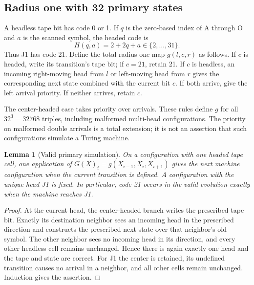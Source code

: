 \documentclass[11pt,letterpaper]{article}
\newtheorem{lemma}[theorem]{Lemma}
\theoremstyle{definition}\newtheorem{definition}[theorem]{Definition}
\theoremstyle{remark}\newtheorem{remark}[theorem]{Remark}
\begin{document}
\subsection{Radius one with 32 primary states}
A headless tape bit has code 0 or 1. If $q$ is the zero-based index of A through O and $a$ is the scanned symbol, the headed code is
\[
 H(q,a)=2+2q+a\in\{2,\ldots,31\}.
\]
Thus J1 has code 21. Define the total radius-one map $g(l,c,r)$ as follows. If $c$ is headed, write its transition's tape bit; if $c=21$, retain 21. If $c$ is headless, an incoming right-moving head from $l$ or left-moving head from $r$ gives the corresponding next state combined with the current bit $c$. If both arrive, give the left arrival priority. If neither arrives, retain $c$.

The center-headed case takes priority over arrivals. These rules define $g$ for all $32^3=32768$ triples, including malformed multi-head configurations. The priority on malformed double arrivals is a total extension; it is not an assertion that such configurations simulate a Turing machine.

\begin{lemma}[Valid primary simulation]\label{ptr:la:lem:primary}
On a configuration with one headed tape cell, one application of $G(X)_i=g(X_{i-1},X_i,X_{i+1})$ gives the next machine configuration when the current transition is defined. A configuration with the unique head J1 is fixed. In particular, code 21 occurs in the valid evolution exactly when the machine reaches J1.
\end{lemma}
\begin{proof}
At the current head, the center-headed branch writes the prescribed tape bit. Exactly its destination neighbor sees an incoming head in the prescribed direction and constructs the prescribed next state over that neighbor's old symbol. The other neighbor sees no incoming head in its direction, and every other headless cell remains unchanged. Hence there is again exactly one head and the tape and state are correct. For J1 the center is retained, its undefined transition causes no arrival in a neighbor, and all other cells remain unchanged. Induction gives the assertion.
\end{proof}
\end{document}
